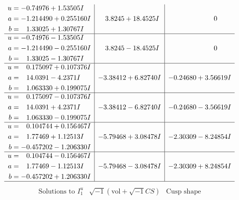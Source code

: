 \documentclass[1p]{elsarticle_modified}
\theoremstyle{definition}
\newcommand{\I}{\sqrt{-1}}
\begin{document}
$$\begin{array}{c|c|c}
\begin{aligned}
u &= -0.74976 + 1.53505 I \\
a &= -1.214490 + 0.255160 I \\
b &= \phantom{-}1.33025 + 1.30767 I\end{aligned}
 & \phantom{-}3.8245 + 18.4525 I & \phantom{-0.000000 } 0 \\ \hline\begin{aligned}
u &= -0.74976 - 1.53505 I \\
a &= -1.214490 - 0.255160 I \\
b &= \phantom{-}1.33025 - 1.30767 I\end{aligned}
 & \phantom{-}3.8245 - 18.4525 I & \phantom{-0.000000 } 0 \\ \hline\begin{aligned}
u &= \phantom{-}0.175097 + 0.107376 I \\
a &= \phantom{-}14.0391 - 4.2371 I \\
b &= \phantom{-}1.063330 + 0.199075 I\end{aligned}
 & -3.38412 + 6.82740 I & -0.24680 + 3.56619 I \\ \hline\begin{aligned}
u &= \phantom{-}0.175097 - 0.107376 I \\
a &= \phantom{-}14.0391 + 4.2371 I \\
b &= \phantom{-}1.063330 - 0.199075 I\end{aligned}
 & -3.38412 - 6.82740 I & -0.24680 - 3.56619 I \\ \hline\begin{aligned}
u &= \phantom{-}0.104744 + 0.156467 I \\
a &= \phantom{-}1.77469 + 1.12513 I \\
b &= -0.457202 - 1.206330 I\end{aligned}
 & -5.79468 + 3.08478 I & -2.30309 - 8.24854 I \\ \hline\begin{aligned}
u &= \phantom{-}0.104744 - 0.156467 I \\
a &= \phantom{-}1.77469 - 1.12513 I \\
b &= -0.457202 + 1.206330 I\end{aligned}
 & -5.79468 - 3.08478 I & -2.30309 + 8.24854 I\\
 \hline 
 \end{array}$$\newpage$$\begin{array}{c|c|c}  
\text{Solutions to }I^u_{1}& \I (\text{vol} + \sqrt{-1}CS) & \text{Cusp shape}\\
 \hline 
\begin{aligned}

\end{aligned}
\end{array}$$
\end{document}
